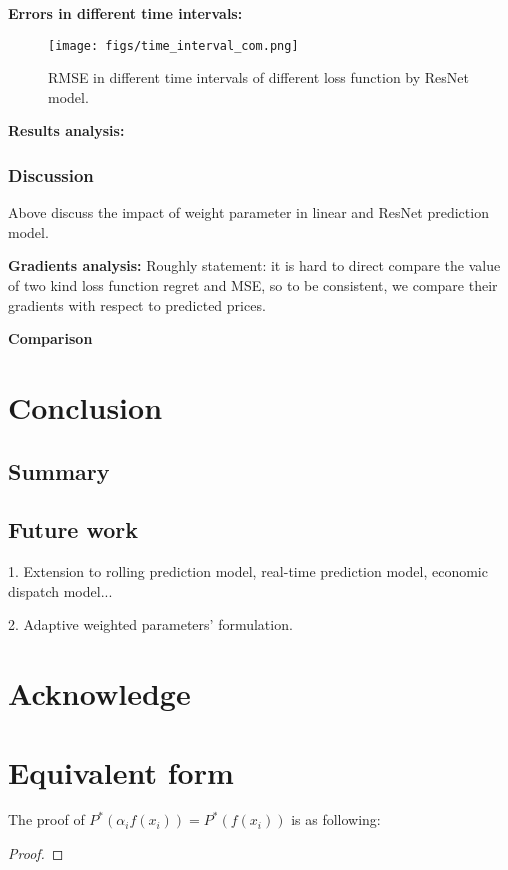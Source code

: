 \documentclass[journal]{IEEEtran}
\newcommand{\slw}{\color{blue}}
\begin{document}
\textbf{Errors in different time intervals:}

\begin{figure}[ht]
  \centering
  \texttt{[image: figs/time\_interval\_com.png]}
  \caption{RMSE in different time intervals of different loss function by ResNet model.}
  \label{interval_comparison_Res}
\end{figure}

\textbf{Results analysis:}

\subsubsection{Discussion}
Above discuss the impact of weight parameter in linear and ResNet prediction model.

\textbf{Gradients analysis:} 
{\slw Roughly statement: it is hard to direct compare the value of two kind loss function regret and MSE, so to be consistent, we compare their gradients with respect to predicted prices.}

\textbf{Comparison}

\section{Conclusion}
\subsection{Summary}

\subsection{Future work}
1. Extension to rolling prediction model, real-time prediction model, economic dispatch model...

2. Adaptive weighted parameters' formulation.

\section*{Acknowledge}

\appendices

\section{Equivalent form}
The proof of $P^*(\alpha_i f(x_i)) = P^*(f(x_i))$ is as following:
\begin{proof}
  
\end{proof}
\end{document}
